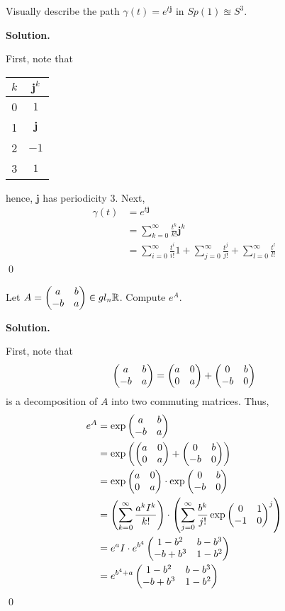 \documentclass[12pt]{book}
\theoremstyle{definition}
\newenvironment{solution}
{%
  \par\noindent\textbf{Solution.}\quad
}
{%
  \qed\par
}
\begin{document}
\begin{taggedexercise}[WIP]
  Visually describe the path $\gamma(t) = e^{t\mathbf{j}}$ in $Sp(1) \approxeq S^3$.
\end{taggedexercise}

\begin{solution}
  First, note that
  \begin{table}[ht]
    \centering
    \begin{tabular}{c|c}

    $k$ & $\mathbf{j}^k$  \\ 
    \hline
    0 & $1$ \\
    1 & $\mathbf{j}$ \\
    2 & $-1$ \\
    3 & $1$ \\
    \end{tabular}
    \end{table}

  hence, $\mathbf{j}$ has periodicity $3$.
  Next,
  \[
  \begin{aligned}
    \gamma(t) &= e^{t\mathbf{j}} \\
              &= \sum_{k=0}^\infty \frac{t^k}{k!} \mathbf{j}^k\\
              &= \sum_{i=0}^\infty \frac{t^i}{i!}1 + \sum_{j=0}^\infty \frac{t^j}{j!} + \sum_{l=0}^\infty \frac{t^l}{l!}
  \end{aligned}
  \]  
\end{solution}

\begin{taggedexercise}[WIP]
  Let $A = \begin{pmatrix} a & b \\ -b & a \end{pmatrix} \in gl_n{\mathbb{R}}$.
  Compute $e^A$.
\end{taggedexercise}

\begin{solution}
  First, note that
  \[
    \begin{pmatrix} a & b \\ -b & a \end{pmatrix} = \begin{pmatrix} a & 0 \\ 0 & a \end{pmatrix} + \begin{pmatrix} 0 & b \\ -b & 0 \end{pmatrix}
  \]
  is a decomposition of $A$ into two commuting matrices.
  Thus,
  \[
  \begin{aligned}
    e^A &= \exp{ \begin{pmatrix} a & b \\ -b & a \end{pmatrix} } \\
        &= \exp\left({\begin{pmatrix} a & 0 \\ 0 & a \end{pmatrix} + \begin{pmatrix} 0 & b \\ -b & 0 \end{pmatrix}}\right) \\
        &= \exp\begin{pmatrix} a & 0 \\ 0 & a \end{pmatrix} \cdot \exp\begin{pmatrix} 0 & b \\ -b & 0 \end{pmatrix} \\
        &= \left(\sum_{k=0}^\infty \frac{a^kI^k}{k!} \right) \cdot \left(\sum_{j=0}^\infty \frac{b^k}{j!}\exp\begin{pmatrix} 0 & 1 \\ -1 & 0 \end{pmatrix}^j\right) \\
        &= e^{a}I \cdot e^{b^4}\begin{pmatrix} 1-b^2 & b-b^3 \\ -b+b^3 & 1-b^2 \end{pmatrix} \\
        &= e^{b^4 + a}\begin{pmatrix} 1-b^2 & b-b^3 \\ -b+b^3 & 1-b^2 \end{pmatrix}
  \end{aligned}
  \]
\end{solution}
\end{document}
